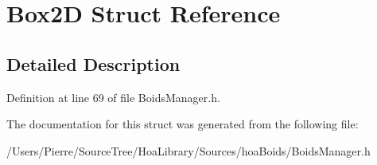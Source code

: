 \hypertarget{struct_box2_d}{\section{Box2\-D Struct Reference}
\label{struct_box2_d}
}


\subsection{Detailed Description}


Definition at line 69 of file Boids\-Manager.\-h.



The documentation for this struct was generated from the following file\-:\begin{DoxyCompactItemize}
\item 
/\-Users/\-Pierre/\-Source\-Tree/\-Hoa\-Library/\-Sources/hoa\-Boids/Boids\-Manager.\-h\end{DoxyCompactItemize}
